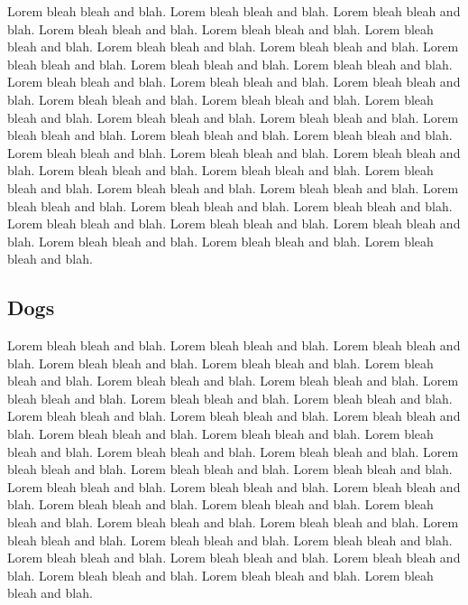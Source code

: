 \documentclass[letterpaper,10pt]{article}
\begin{document}
Lorem bleah bleah and blah. Lorem bleah bleah and blah. Lorem bleah
bleah and blah. Lorem bleah bleah and blah. Lorem bleah bleah and
blah. Lorem bleah bleah and blah. Lorem bleah bleah and blah. Lorem
bleah bleah and blah. Lorem bleah bleah and blah. Lorem bleah bleah
and blah. Lorem bleah bleah and blah. Lorem bleah bleah and blah.
Lorem bleah bleah and blah. Lorem bleah bleah and blah. Lorem bleah
bleah and blah. Lorem bleah bleah and blah. Lorem bleah bleah and
blah. Lorem bleah bleah and blah. Lorem bleah bleah and blah. Lorem
bleah bleah and blah. Lorem bleah bleah and blah. Lorem bleah bleah
and blah. Lorem bleah bleah and blah. Lorem bleah bleah and blah.
Lorem bleah bleah and blah. Lorem bleah bleah and blah. Lorem bleah
bleah and blah. Lorem bleah bleah and blah. Lorem bleah bleah and
blah. Lorem bleah bleah and blah. Lorem bleah bleah and blah. Lorem
bleah bleah and blah. Lorem bleah bleah and blah. Lorem bleah bleah
and blah. Lorem bleah bleah and blah. Lorem bleah bleah and blah.
Lorem bleah bleah and blah. Lorem bleah bleah and blah. Lorem bleah
bleah and blah.

\subsection {Dogs}

Lorem bleah bleah and blah. Lorem bleah bleah and blah. Lorem bleah
bleah and blah. Lorem bleah bleah and blah. Lorem bleah bleah and
blah. Lorem bleah bleah and blah. Lorem bleah bleah and blah. Lorem
bleah bleah and blah. Lorem bleah bleah and blah. Lorem bleah bleah
and blah. Lorem bleah bleah and blah. Lorem bleah bleah and blah.
Lorem bleah bleah and blah. Lorem bleah bleah and blah. Lorem bleah
bleah and blah. Lorem bleah bleah and blah. Lorem bleah bleah and
blah. Lorem bleah bleah and blah. Lorem bleah bleah and blah. Lorem
bleah bleah and blah. Lorem bleah bleah and blah. Lorem bleah bleah
and blah. Lorem bleah bleah and blah. Lorem bleah bleah and blah.
Lorem bleah bleah and blah. Lorem bleah bleah and blah. Lorem bleah
bleah and blah. Lorem bleah bleah and blah. Lorem bleah bleah and
blah. Lorem bleah bleah and blah. Lorem bleah bleah and blah. Lorem
bleah bleah and blah. Lorem bleah bleah and blah. Lorem bleah bleah
and blah. Lorem bleah bleah and blah. Lorem bleah bleah and blah.
Lorem bleah bleah and blah. Lorem bleah bleah and blah. Lorem bleah
bleah and blah.
\end{document}
